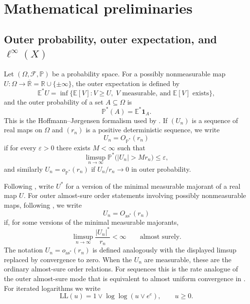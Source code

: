 \documentclass[11pt]{article}
\begin{document}
\section{Mathematical preliminaries}

\label{sec:prelim}

\subsection{\texorpdfstring{Outer probability, outer expectation, and $\ell^{\infty}(X)$}{Outer
probability, outer expectation, and l-infinity(X)}}

Let $(\Omega,\mathcal{F},\mathbb{P})$ be a probability space. For
a possibly nonmeasurable map $U:\Omega\to\overline{\mathbb{R}}=\mathbb{R}\cup\{\pm\infty\}$,
the outer expectation is defined by 
\begin{equation}
\mathbb{E}^{*}U=\inf\bigl\{\mathbb{E}[V]:V\ge U,\;V\text{ measurable, and }\mathbb{E}[V]\text{ exists}\bigr\},\label{eq:outer-expectation}
\end{equation}
and the outer probability of a set $A\subseteq\Omega$ is 
\[
\mathbb{P}^{*}(A)=\mathbb{E}^{*}\mathbf{1}_{A}.
\]
This is the Hoffmann--Jørgensen formalism used by \citet{vdVW2023}.
If $(U_{n})$ is a sequence of real maps on $\Omega$ and $(r_{n})$
is a positive deterministic sequence, we write 
\[
U_{n}=O_{\mathbb{P}^{*}}(r_{n})
\]
if for every $\varepsilon>0$ there exists $M<\infty$ such that 
\[
\limsup_{n\to\infty}\mathbb{P}^{*}\bigl(\lvert U_{n}\rvert>Mr_{n}\bigr)\le\varepsilon,
\]
and similarly $U_{n}=o_{\mathbb{P}^{*}}(r_{n})$ if $U_{n}/r_{n}\to0$
in outer probability.

Following \citet[Lemma~1.2.1]{vdVW2023}, write $U^{*}$ for
a version of the minimal measurable majorant of a real map $U$. For
outer almost-sure order statements involving possibly nonmeasurable
maps, following \citet[Definition~1.9.1 and Lemma~1.9.2]{vdVW2023}, we write
\[
U_{n}=O_{\mathrm{as}^{*}}(r_{n})
\]
if, for some versions of the minimal measurable majorants,
\[
\limsup_{n\to\infty}\frac{\lvert U_{n}\rvert^{*}}{r_{n}}<\infty\qquad\text{almost surely}.
\]
The notation $U_{n}=o_{\mathrm{as}^{*}}(r_{n})$ is defined analogously
with the displayed limsup replaced by convergence to zero. When the
$U_{n}$ are measurable, these are the ordinary almost-sure order
relations. For sequences this is the rate analogue of the outer almost-sure
mode that is equivalent to almost uniform convergence in \citet[Lemma~1.9.2]{vdVW2023}.
For iterated logarithms we write 
\[
\mathrm{LL}(u)=1\vee\log\log(u\vee e^{e}),\qquad u\ge0.
\]
\end{document}
